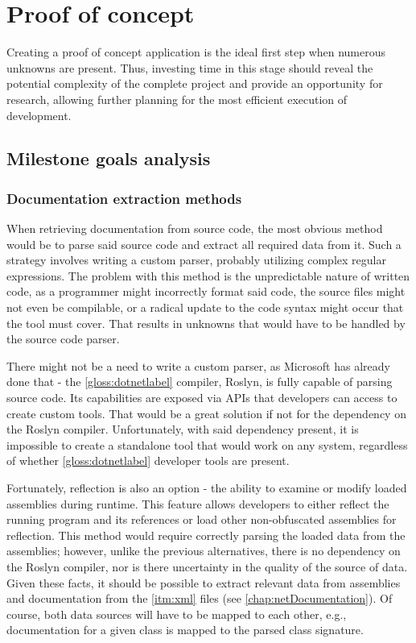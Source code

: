 \chapter{Proof of concept} \label{chap:proofConcept}

Creating a proof of concept application is the ideal first step when numerous unknowns are present. Thus, investing time in this stage should reveal the potential complexity of the complete project and provide an opportunity for research, allowing further planning for the most efficient execution of development.

\section{Milestone goals analysis}

\subsection{Documentation extraction methods}
When retrieving documentation from source code, the most obvious method would be to parse said source code and extract all required data from it. Such a strategy involves writing a custom parser, probably utilizing complex regular expressions. The problem with this method is the unpredictable nature of written code, as a programmer might incorrectly format said code, the source files might not even be compilable, or a radical update to the code syntax might occur that the tool must cover. That results in unknowns that would have to be handled by the source code parser.

There might not be a need to write a custom parser, as Microsoft has already done that - the \ref{gloss:dotnetlabel} compiler, Roslyn, is fully capable of parsing source code. Its capabilities are exposed via APIs that developers can access to create custom tools. That would be a great solution if not for the dependency on the Roslyn compiler. Unfortunately, with said dependency present, it is impossible to create a standalone tool that would work on any system, regardless of whether \ref{gloss:dotnetlabel} developer tools are present.

Fortunately, reflection is also an option - the ability to examine or modify loaded assemblies during runtime. This feature allows developers to either reflect the running program and its references or load other non-obfuscated assemblies for reflection. This method would require correctly parsing the loaded data from the assemblies; however, unlike the previous alternatives, there is no dependency on the Roslyn compiler, nor is there uncertainty in the quality of the source of data. Given these facts, it should be possible to extract relevant data from assemblies and documentation from the \ref{itm:xml} files (see \ref{chap:netDocumentation}). Of course, both data sources will have to be mapped to each other, e.g., documentation for a given class is mapped to the parsed class signature.

